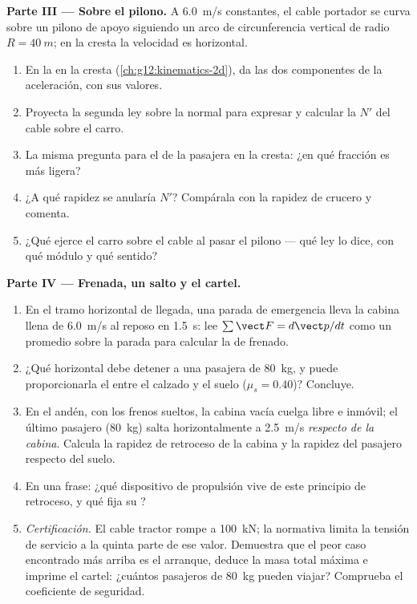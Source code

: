 \begin{problem}
\medskip
\noindent\textbf{Parte III --- Sobre el pilono.} A \qty{6.0}{m/s} constantes, el cable
portador se curva sobre un pilono de apoyo siguiendo un arco de circunferencia
vertical de radio $R = \qty{40}{m}$; en la cresta la velocidad es horizontal.
\begin{enumerate}[resume]
  \item En la  en la cresta (\cref{ch:g12:kinematics-2d}), da las dos
        componentes de la aceleración, con sus valores.
  \item Proyecta la segunda ley sobre la normal para expresar y calcular la  $N'$ del cable sobre el carro.
  \item La misma pregunta para el  de la pasajera en la cresta: ¿en qué
        fracción es más ligera?
  \item ¿A qué rapidez se anularía $N'$? Compárala con la rapidez de crucero y
        comenta.
  \item ¿Qué  ejerce el carro sobre el cable al pasar el pilono --- qué ley lo
        dice, con qué módulo y qué sentido?
\end{enumerate}

\medskip
\noindent\textbf{Parte IV --- Frenada, un salto y el cartel.}
\begin{enumerate}[resume]
  \item En el tramo horizontal de llegada, una parada de emergencia lleva la cabina
        llena de \qty{6.0}{m/s} al reposo en \qty{1.5}{s}: lee
        $\sum \vect F = d\vect p/dt$ como un promedio sobre la parada para calcular la
         de frenado.
  \item ¿Qué  horizontal debe detener a una pasajera de \qty{80}{kg}, y puede
        proporcionarla el  entre el calzado y el suelo
        ($\mu_s = 0.40$)? Concluye.
  \item En el andén, con los frenos sueltos, la cabina vacía cuelga libre e inmóvil; el
        último pasajero (\qty{80}{kg}) salta horizontalmente a \qty{2.5}{m/s}
        \emph{respecto de la cabina}. Calcula la rapidez de retroceso de la cabina y la
        rapidez del pasajero respecto del suelo.
  \item En una frase: ¿qué dispositivo de propulsión vive de este principio de
        retroceso, y qué fija su ?
  \item \emph{Certificación.} El cable tractor rompe a \qty{100}{kN}; la normativa
        limita la tensión de servicio a la quinta parte de ese valor. Demuestra que el
        peor caso encontrado más arriba es el arranque, deduce la masa total máxima e
        imprime el cartel: ¿cuántos pasajeros de \qty{80}{kg} pueden viajar? Comprueba
        el coeficiente de seguridad.
\end{enumerate}
\end{problem}
